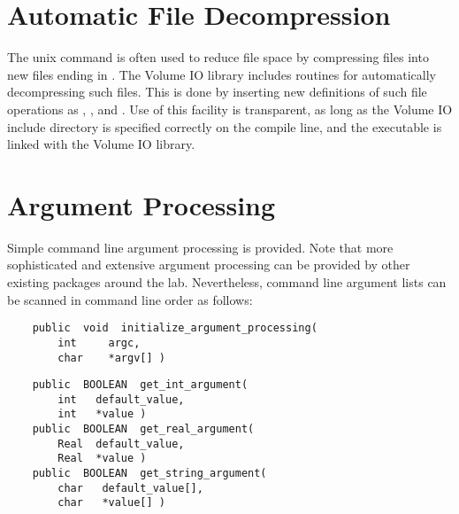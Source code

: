 \section{Automatic File Decompression}

The unix command  is often used to reduce file space by
compressing files into new files ending in .  The Volume IO
library includes routines for automatically decompressing such files.
This is done by inserting new definitions of such file operations as
, , and .  Use of this facility
is transparent, as long as the Volume IO include directory is specified
correctly on the compile line, and the executable is linked with the
Volume IO library.

\section{Argument Processing}

Simple command line argument processing is provided.  Note that more
sophisticated and extensive argument processing can be provided by
other existing packages around the lab.  Nevertheless, command line
argument lists can be scanned in command line order as follows:

{\bf\begin{verbatim}
    public  void  initialize_argument_processing(
        int     argc,
        char    *argv[] )
\end{verbatim}}


{\bf\begin{verbatim}
    public  BOOLEAN  get_int_argument(
        int   default_value,
        int   *value )
    public  BOOLEAN  get_real_argument(
        Real  default_value,
        Real  *value )
    public  BOOLEAN  get_string_argument(
        char   default_value[],
        char   *value[] )
\end{verbatim}}



